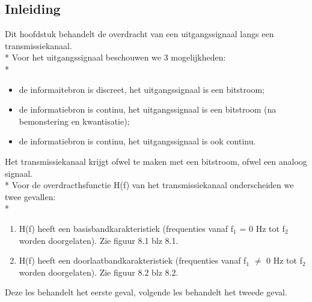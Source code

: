 \documentclass[10pt]{article}
\begin{document}
\subsection{Inleiding}
Dit hoofdstuk behandelt de overdracht van een uitgangssignaal langs een transmissiekanaal.\\*
Voor het uitgangssignaal beschouwen we 3 mogelijkheden:\\*
\begin{itemize}
\item de informaitebron is discreet, het uitgangssignaal is een bitstroom;
\item de informatiebron is continu, het uitgangssignaal is een bitstroom (na bemonstering en kwantisatie);
\item de informatiebron is continu, het uitgangssignaal is ook continu.
\end{itemize}
Het transmissiekanaal krijgt ofwel te maken met een bitstroom, ofwel een analoog signaal.\\*
Voor de overdracthsfunctie H(f) van het transmissiekanaal onderscheiden we twee gevallen:\\*
\begin{enumerate}
\item H(f) heeft een basisbandkarakteristiek (frequenties vanaf f$_1$ = 0 Hz tot f$_2$ worden doorgelaten). {\scriptsize Zie figuur 8.1 blz 8.1.}
\item H(f) heeft een doorlaatbandkarakteristiek (frequenties vanaf f$_1$ $\ne$ 0 Hz tot f$_2$ worden doorgelaten). {\scriptsize Zie figuur 8.2 blz 8.2.}
\end{enumerate}
Deze les behandelt het eerste geval, volgende les behandelt het tweede geval.
\end{document}
